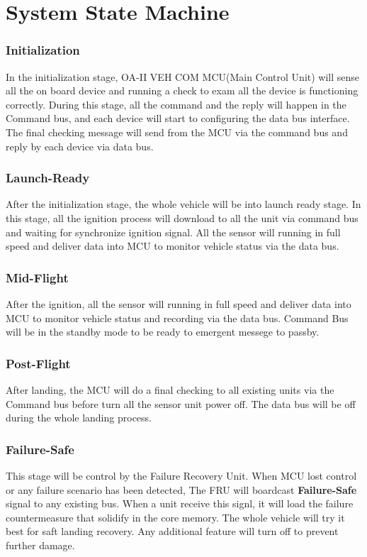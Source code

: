 \documentclass[12pt,article]{memoir}
\begin{document}
\chapter{System State Machine}
\subsection{Initialization}
In the initialization stage, OA-II VEH COM MCU(Main Control Unit) will sense all the on board device and running a check to exam all the device is functioning correctly. During this stage, all the command and the reply will happen in the Command bus, and each device will start to configuring the data bus interface. The final checking message will send from the MCU via the command bus and reply by each device via data bus.
\subsection{Launch-Ready}
After the initialization stage, the whole vehicle will be into launch ready stage. In this stage, all the ignition process will download to all the unit via command bus and waiting for synchronize ignition signal. All the sensor will running in full speed and deliver data into MCU to monitor vehicle status via the data bus.
\subsection{Mid-Flight}
After the ignition, all the sensor will running in full speed and deliver data into MCU to monitor vehicle status and recording via the data bus. Command Bus will be in the standby mode to be ready to emergent messege to passby.
\subsection{Post-Flight}
After landing, the MCU will do a final checking to all existing units via the Command bus before turn all the sensor unit power off. The data bus will be off during the whole landing process.
\subsection{Failure-Safe}
This stage will be control by the Failure Recovery Unit. When MCU lost control or any failure scenario has been detected, The FRU will boardcast \textbf{Failure-Safe} signal to any existing bus. When a unit receive this signl, it will load the failure countermeasure that solidify in the core memory. The whole vehicle will try it best for saft landing recovery. Any additional feature will turn off to prevent further damage.
\newpage
\end{document}
